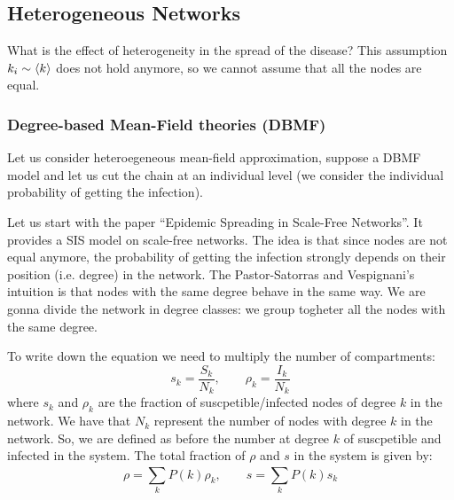 \documentclass[../main/main.tex]{subfiles}
\begin{document}


\subsection{Heterogeneous Networks}

What is the effect of heterogeneity in the spread of the disease? This assumption \( k_i \sim \expval{k}  \) does not hold anymore, so we cannot assume that all the nodes are equal.

\subsubsection{Degree-based Mean-Field theories (DBMF)}

Let us consider heteroegeneous mean-field approximation, suppose a DBMF model and let us cut the chain at an individual level (we consider the individual probability of getting the infection).

Let us start with the paper “Epidemic Spreading in Scale-Free Networks”. It provides a SIS model on scale-free networks.
The idea is that since nodes are not equal anymore, the probability of getting the infection strongly depends on their position (i.e. degree) in the network. The Pastor-Satorras and Vespignani's intuition is that nodes with the same degree behave in the same way.
We are gonna divide the network in degree classes: we group togheter all the nodes with the same degree.

To write down the equation we need to multiply the number of compartments:
\begin{equation*}
  s_k = \frac{S_k}{N_k}, \qquad \rho _k = \frac{I_k}{N_k}
\end{equation*}
where \( s_k \) and \( \rho _k \) are the fraction of suscpetible/infected nodes of degree \( k \) in the network. We have that \( N_k \) represent the number of nodes with degree \( k \) in the network. So, we are defined as before the number at degree \( k \) of suscpetible and infected in the system.
The total fraction of \( \rho  \) and \( s \) in the system is given by:
\begin{equation}
  \rho = \sum_{k}^{} P(k) \rho _k, \qquad s = \sum_{k}^{} P(k) s_k
\end{equation}
\end{document}
